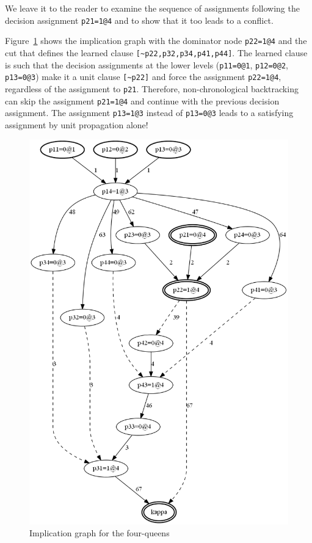 \documentclass[11pt]{report}
\newcommand*{\p}[1]{\textup{\texttt{#1}}}
\begin{document}
We leave it to the reader to examine the sequence of assignments
following the decision assignment \p{p21=1@4} and to show that it too
leads to a conflict.

Figure~\ref{queens-ig} shows the implication graph with the dominator
node \verb+p22=1@4+ and the cut that defines the learned clause
\verb+[~p22,p32,p34,p41,p44]+. The learned clause is such that the
decision assignments at the lower levels (\verb+p11=0@1+,
\verb+p12=0@2+, \verb+p13=0@3+) make it a unit clause \verb+[~p22]+ and
force the assignment \p{p22=1@4}, regardless of the assignment to
\p{p21}. Therefore, non-chronological backtracking can skip the
assignment \p{p21=1@4} and continue with the previous decision
assignment. The assignment \p{p13=1@3} instead of \p{p13=0@3} leads to a
satisfying assignment by unit propagation alone!
 
\begin{figure}[b]
\begin{center}
\includegraphics[keepaspectratio=true,height=.9\textheight]{queens-bw}
\end{center}
\caption{Implication graph for the four-queens}\label{queens-ig}
\end{figure}
\end{document}

